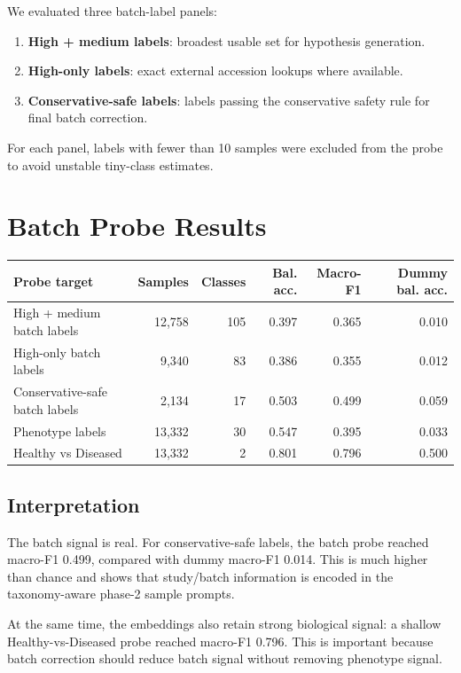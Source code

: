 \documentclass[11pt]{article}
\begin{document}
We evaluated three batch-label panels:

\begin{enumerate}
  \item \textbf{High + medium labels}: broadest usable set for hypothesis generation.
  \item \textbf{High-only labels}: exact external accession lookups where available.
  \item \textbf{Conservative-safe labels}: labels passing the conservative safety rule for
  final batch correction.
\end{enumerate}

For each panel, labels with fewer than 10 samples were excluded from the probe to avoid
unstable tiny-class estimates.

\section{Batch Probe Results}

\begin{center}
\begin{tabular}{lrrrrr}
\toprule
Probe target & Samples & Classes & Bal. acc. & Macro-F1 & Dummy bal. acc. \\
\midrule
High + medium batch labels & 12,758 & 105 & 0.397 & 0.365 & 0.010 \\
High-only batch labels & 9,340 & 83 & 0.386 & 0.355 & 0.012 \\
Conservative-safe batch labels & 2,134 & 17 & 0.503 & 0.499 & 0.059 \\
Phenotype labels & 13,332 & 30 & 0.547 & 0.395 & 0.033 \\
Healthy vs Diseased & 13,332 & 2 & 0.801 & 0.796 & 0.500 \\
\bottomrule
\end{tabular}
\end{center}

\subsection{Interpretation}

The batch signal is real. For conservative-safe labels, the batch probe reached macro-F1
0.499, compared with dummy macro-F1 0.014. This is much higher than chance and shows
that study/batch information is encoded in the taxonomy-aware phase-2 sample prompts.

At the same time, the embeddings also retain strong biological signal: a shallow
Healthy-vs-Diseased probe reached macro-F1 0.796. This is important because batch
correction should reduce batch signal without removing phenotype signal.
\end{document}
